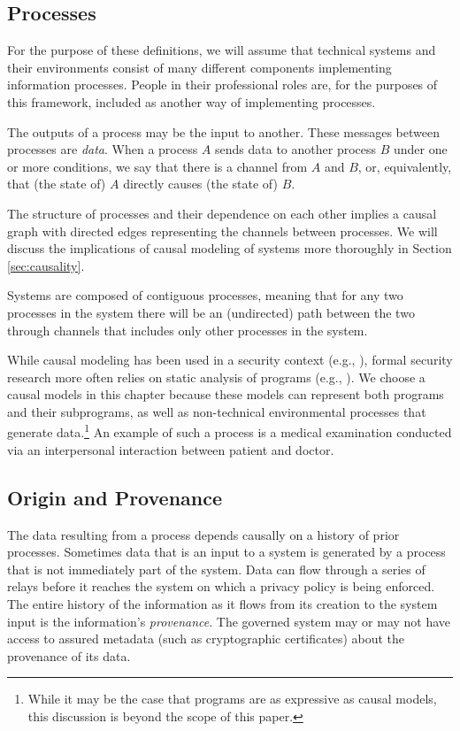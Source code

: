 \documentclass[../thesis.tex]{subfiles}
\begin{document}
\subsection{Processes}

For the purpose of these definitions, we will assume that
technical systems and their environments consist of many
different components implementing information processes.
People in their professional roles are, for the purposes of 
this framework, included as another way of implementing processes.

The outputs of a process may be the input to another.
These messages between processes are \emph{data}.
When a process $A$ sends data to another process $B$ under one or
more conditions, we say that there is a channel from $A$ and $B$,
or, equivalently, that (the state of) $A$ directly causes
(the state of) $B$.

The structure of processes and their dependence on each other
implies a causal graph \cite{pearl1988probabilistic} with directed
edges representing the channels between processes.
We will discuss the implications of causal modeling of systems
more thoroughly in Section \ref{sec:causality}.

%
%

Systems are composed of contiguous processes,
meaning that for any two processes in the system there will
be an (undirected) path between the two through channels that
includes only other processes in the system.

While causal modeling has been used in a security context
(e.g., \citet{feng2014security}), formal security research
more often relies on static analysis of programs (e.g., \citet{mclean90sp}).
We choose a causal models in this chapter because
these models can represent both programs and their
subprograms,
as well as non-technical environmental processes
that generate data.\footnote{While it may be the case that
  programs are as expressive as causal models, this
discussion is beyond the scope of this paper.}
An example of such a process is a medical examination
conducted via an interpersonal interaction between
patient and doctor.

\subsection{Origin and Provenance}

The data resulting from a process depends causally
on a history of prior processes.
Sometimes data that is an input to a system
is generated by a process that is not immediately part
of the system.
Data can flow through 
a series of relays before it reaches
the system on which a privacy policy is being enforced.
The entire history of the information as it flows from its 
creation to the system input is the information's 
\emph{provenance}.
The governed system may or may not have access to
assured metadata (such as cryptographic certificates)
about the provenance of its data.
\end{document}
